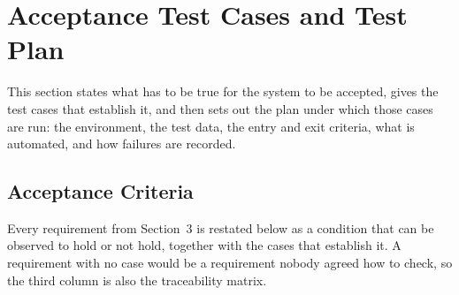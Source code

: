 \section{Acceptance Test Cases and Test Plan}

This section states what has to be true for the system to be accepted, gives the test
cases that establish it, and then sets out the plan under which those cases are run:
the environment, the test data, the entry and exit criteria, what is automated, and how
failures are recorded.

\subsection{Acceptance Criteria}

Every requirement from Section~3 is restated below as a condition that can be observed
to hold or not hold, together with the cases that establish it. A requirement with no
case would be a requirement nobody agreed how to check, so the third column is also the
traceability matrix.

